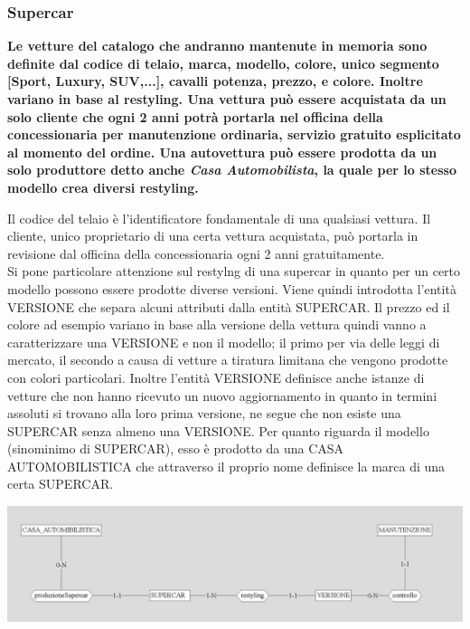 \documentclass[11pt]{article}
\begin{document}
\subsubsection{Supercar}
\textbf{Le vetture del catalogo che andranno mantenute in memoria sono definite
dal codice di telaio, marca, modello, colore, unico segmento [Sport, Luxury,
SUV,...], cavalli potenza, prezzo, e colore. Inoltre variano in base al
restyling. Una vettura può essere acquistata da un solo cliente che ogni 2 anni
potrà portarla nel officina della concessionaria per manutenzione ordinaria,
servizio gratuito esplicitato al momento del ordine. Una autovettura può essere
prodotta da un solo produttore detto anche \textit{Casa Automobilista}, la quale
per lo stesso modello crea diversi restyling.}

Il codice del telaio è l'identificatore fondamentale di una qualsiasi vettura.
Il cliente, unico proprietario di una certa vettura acquistata, può portarla in
revisione dal officina della concessionaria ogni 2 anni gratuitamente.\\
Si pone particolare attenzione sul restylng di una supercar in quanto per un
certo modello possono essere prodotte diverse versioni. Viene quindi introdotta
l'entità VERSIONE che separa alcuni attributi dalla entità SUPERCAR. Il prezzo
ed il colore ad esempio variano in base alla versione della vettura quindi vanno
a caratterizzare una VERSIONE e non il modello; il primo per via delle leggi di
mercato, il secondo a causa di vetture a tiratura limitana che vengono prodotte
con colori particolari. Inoltre l'entità VERSIONE definisce anche istanze di
vetture che non hanno ricevuto un nuovo aggiornamento in quanto in termini
assoluti si trovano alla loro prima versione, ne segue che non esiste una
SUPERCAR senza almeno una VERSIONE. Per quanto riguarda il modello (sinominimo
di SUPERCAR), esso è prodotto da una CASA AUTOMOBILISTICA che attraverso il
proprio nome definisce la marca di una certa SUPERCAR.

\begin{center}
    \includegraphics[width=\linewidth]{images/versione.png}
\end{center}
\end{document}

